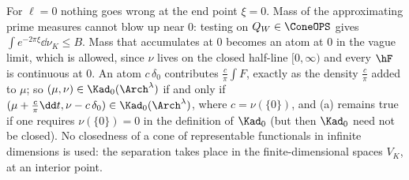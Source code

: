\begin{remark}[The point $\xi=0$]\label{rem:xi0}
For $\ell=0$ nothing goes wrong at the end point $\xi=0$. Mass of the approximating prime measures cannot blow up near $0$: testing on
$Q_W\in\ConeOPS$ gives $\int e^{-2\pi\xi}\dd\nu_K\le B$. Mass that accumulates at $0$ becomes an atom at $0$ in the vague limit, which is allowed,
since $\nu$ lives on the closed half-line $[0,\infty)$ and every $\hF$ is continuous at $0$. An atom $c\,\delta_0$ contributes $\frac c\pi\int F$,
exactly as the density $\frac c\pi$ added to $\mu$; so $(\mu,\nu)\in\Kad_0(\Arch^\lambda)$ if and only if
$(\mu+\frac c\pi\dd t,\nu-c\,\delta_0)\in\Kad_0(\Arch^\lambda)$, where $c=\nu(\{0\})$, and (a) remains true if one requires $\nu(\{0\})=0$ in
the definition of $\Kad_0$ (but then $\Kad_0$ need not be closed). No closedness of a cone of representable functionals in infinite dimensions
is used: the separation takes place in the finite-dimensional spaces $V_K$, at an interior point.
\end{remark}
